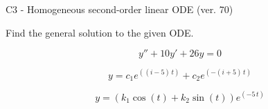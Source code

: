 \begin{exercise}
  \begin{exerciseTitle}C3 - Homogeneous second-order linear ODE (ver. 70)\end{exerciseTitle}
  \begin{exerciseStatement}
    
Find the general solution to the given ODE.

    
\[y''+10y'+26y = 0\]

  \end{exerciseStatement}
  \begin{exerciseAnswer}
    
\[y= c_{1} e^{\left(\left(i - 5\right) \, t\right)} + c_{2} e^{\left(-\left(i + 5\right) \, t\right)}\]

    
\[y= {\left(k_{1} \cos\left(t\right) + k_{2} \sin\left(t\right)\right)} e^{\left(-5 \, t\right)}\]

  \end{exerciseAnswer}
\end{exercise}
